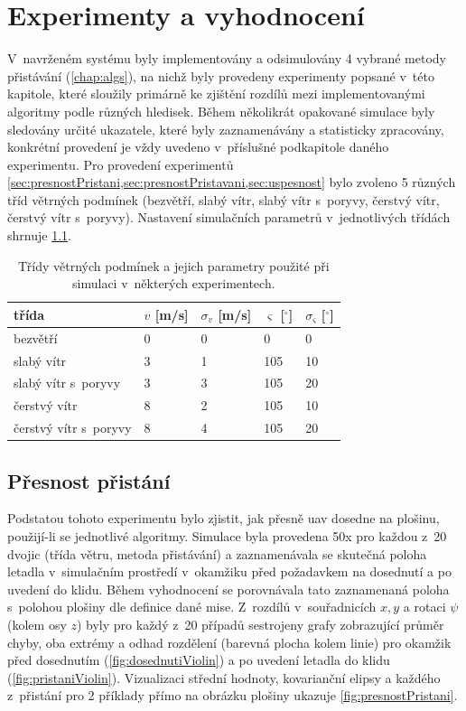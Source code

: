 \chapter{Experimenty a vyhodnocení} \label{chap:eval}
  V~navrženém systému byly implementovány a odsimulovány 4 vybrané metody přistávání (\cref{chap:algs}), na nichž byly provedeny experimenty popsané v~této kapitole, které sloužily primárně ke zjištění rozdílů mezi implementovanými algoritmy podle různých hledisek. Během několikrát opakované simulace byly sledovány určité ukazatele, které byly zaznamenávány a statisticky zpracovány, konkrétní provedení je vždy uvedeno v~příslušné podkapitole daného experimentu. Pro provedení experimentů \cref*{sec:presnostPristani,sec:presnostPristavani,sec:uspesnost} bylo zvoleno 5 různých tříd větrných podmínek (bezvětří, slabý vítr, slabý vítr s~poryvy, čerstvý vítr, čerstvý vítr s~poryvy). Nastavení simulačních parametrů v~jednotlivých třídách shrnuje \cref{tab:tridyVetru}.
  \begin{table}[H]
    \centering
    \begin{tabular}{@{}lllll@{}}
      \hline
      třída & $v$ [m/s] & $\sigma_v$ [m/s] & $\varsigma$ [$^{\circ}$] & $\sigma_\varsigma$ [$^{\circ}$] \bigstrut\\
      \hline
      bezvětří & 0     & 0     & 0     & 0 \bigstrut[t]\\
      slabý vítr & 3     & 1     & 105   & 10 \\
      slabý vítr s~poryvy & 3     & 3     & 105   & 20 \\
      čerstvý vítr & 8     & 2     & 105   & 10 \\
      čerstvý vítr s~poryvy & 8     & 4     & 105   & 20 \bigstrut[b]\\
      \hline
      \end{tabular}%
    \caption[Třídy větrných podmínek]{Třídy větrných podmínek a jejich parametry použité při simulaci v~některých experimentech.}
    \label{tab:tridyVetru}
  \end{table}
  \section{Přesnost přistání} \label{sec:presnostPristani}
    
    Podstatou tohoto experimentu bylo zjistit, jak přesně \acrshort{uav} dosedne na plošinu, použijí-li se jednotlivé algoritmy. Simulace byla provedena 50x pro každou z~20 dvojic (třída větru, metoda přistávání) a zaznamenávala se skutečná poloha letadla v~simulačním prostředí v~okamžiku před požadavkem na dosednutí a po uvedení do klidu. Během vyhodnocení se porovnávala tato zaznamenaná poloha s~polohou plošiny dle definice dané mise. Z~rozdílů v~souřadnicích $x, y$ a rotaci $\psi$ (kolem osy $z$) byly pro každý z~20 případů sestrojeny grafy zobrazující průměr chyby, oba extrémy a odhad rozdělení (barevná plocha kolem linie) pro okamžik před dosednutím (\cref{fig:dosednutiViolin}) a po uvedení letadla do klidu (\cref{fig:pristaniViolin}). Vizualizaci střední hodnoty, kovarianční elipsy a každého z~přistání pro 2 příklady přímo na obrázku plošiny ukazuje \cref{fig:presnostPristani}.

